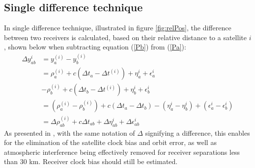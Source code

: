 \subsection{Single difference technique}\label{singleDifference}
In single difference technique, illustrated in figure \ref{fig:relPos}, the difference between two receivers is calculated, based on their relative distance to a satellite $i$, shown below when subtracting equation (\ref{Pb}) from (\ref{Pa}):
\begin{align*}
\Delta y^i_{ab}&=y^{(i)}_a-y^{(i)}_b\\
 		&=\rho^{(i)}_a+c(\Delta t_a-\Delta t^{(i)})+\eta^i_a+\epsilon^i_a\\
 		&-\rho^{(i)}_b+c(\Delta t_b -\Delta t^{(i)})+\eta^i_b+\epsilon^i_b\\
		&=(\rho^{(i)}_a-\rho^{(i)}_b)+c(\Delta t_a-\Delta t_b)-(\eta^i_a-\eta^i_b)+(\epsilon^i_a-\epsilon^i_b)\\
		&=\Delta \rho^{(i)}_{ab}+c\Delta t_{ab}+\Delta \eta^i_{ab}+\Delta \epsilon^i_{ab}
\end{align*}
As presented in \cite{blewitt1997basics}, with the same notation of $\Delta$ signifying a difference, this enables for the elimination of the satellite clock bias and orbit error, as well as atmospheric interference being effectively removed for receiver separations less than 30 km. Receiver clock bias should still be estimated.
